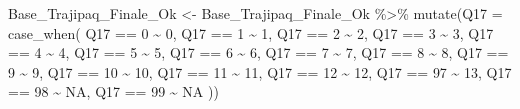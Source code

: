 \documentclass[
]{article}
\newenvironment{Shaded}{\begin{snugshade}}{\end{snugshade}}
\newcommand{\AttributeTok}[1]{\textcolor[rgb]{0.77,0.63,0.00}{#1}}
\newcommand{\ConstantTok}[1]{\textcolor[rgb]{0.00,0.00,0.00}{#1}}
\newcommand{\DecValTok}[1]{\textcolor[rgb]{0.00,0.00,0.81}{#1}}
\newcommand{\FunctionTok}[1]{\textcolor[rgb]{0.00,0.00,0.00}{#1}}
\newcommand{\NormalTok}[1]{#1}
\newcommand{\OtherTok}[1]{\textcolor[rgb]{0.56,0.35,0.01}{#1}}
\newcommand{\SpecialCharTok}[1]{\textcolor[rgb]{0.00,0.00,0.00}{#1}}
\begin{document}
\begin{Shaded}
\begin{Highlighting}[]
\NormalTok{Base\_Trajipaq\_Finale\_Ok }\OtherTok{\textless{}{-}}
\NormalTok{  Base\_Trajipaq\_Finale\_Ok }\SpecialCharTok{\%\textgreater{}\%}
  \FunctionTok{mutate}\NormalTok{(}\AttributeTok{Q17 =} \FunctionTok{case\_when}\NormalTok{(}
\NormalTok{    Q17 }\SpecialCharTok{==} \DecValTok{0} \SpecialCharTok{\textasciitilde{}} \DecValTok{0}\NormalTok{,}
\NormalTok{    Q17 }\SpecialCharTok{==} \DecValTok{1} \SpecialCharTok{\textasciitilde{}} \DecValTok{1}\NormalTok{,}
\NormalTok{    Q17 }\SpecialCharTok{==} \DecValTok{2} \SpecialCharTok{\textasciitilde{}} \DecValTok{2}\NormalTok{,}
\NormalTok{    Q17 }\SpecialCharTok{==} \DecValTok{3} \SpecialCharTok{\textasciitilde{}} \DecValTok{3}\NormalTok{,}
\NormalTok{    Q17 }\SpecialCharTok{==} \DecValTok{4} \SpecialCharTok{\textasciitilde{}} \DecValTok{4}\NormalTok{,}
\NormalTok{    Q17 }\SpecialCharTok{==} \DecValTok{5} \SpecialCharTok{\textasciitilde{}} \DecValTok{5}\NormalTok{,}
\NormalTok{    Q17 }\SpecialCharTok{==} \DecValTok{6} \SpecialCharTok{\textasciitilde{}} \DecValTok{6}\NormalTok{,}
\NormalTok{    Q17 }\SpecialCharTok{==} \DecValTok{7} \SpecialCharTok{\textasciitilde{}} \DecValTok{7}\NormalTok{,}
\NormalTok{    Q17 }\SpecialCharTok{==} \DecValTok{8} \SpecialCharTok{\textasciitilde{}} \DecValTok{8}\NormalTok{,}
\NormalTok{    Q17 }\SpecialCharTok{==} \DecValTok{9} \SpecialCharTok{\textasciitilde{}} \DecValTok{9}\NormalTok{,}
\NormalTok{    Q17 }\SpecialCharTok{==} \DecValTok{10} \SpecialCharTok{\textasciitilde{}} \DecValTok{10}\NormalTok{,}
\NormalTok{    Q17 }\SpecialCharTok{==} \DecValTok{11} \SpecialCharTok{\textasciitilde{}} \DecValTok{11}\NormalTok{,}
\NormalTok{    Q17 }\SpecialCharTok{==} \DecValTok{12} \SpecialCharTok{\textasciitilde{}} \DecValTok{12}\NormalTok{,}
\NormalTok{    Q17 }\SpecialCharTok{==} \DecValTok{97} \SpecialCharTok{\textasciitilde{}} \DecValTok{13}\NormalTok{,}
\NormalTok{    Q17 }\SpecialCharTok{==} \DecValTok{98} \SpecialCharTok{\textasciitilde{}} \ConstantTok{NA}\NormalTok{,}
\NormalTok{    Q17 }\SpecialCharTok{==} \DecValTok{99} \SpecialCharTok{\textasciitilde{}} \ConstantTok{NA}
\NormalTok{  ))}
\end{Highlighting}
\end{Shaded}

\begin{Shaded}
\end{Shaded}
\end{document}
